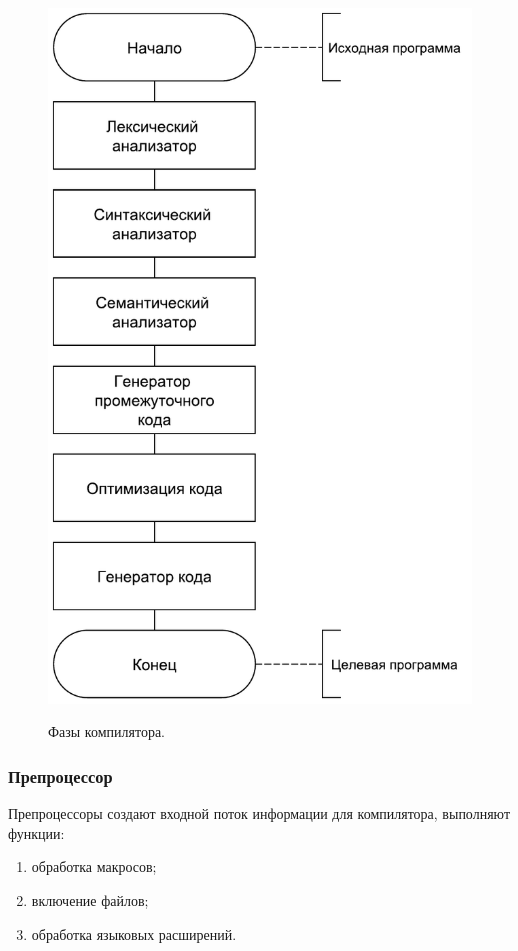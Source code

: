 \begin{figure}[h!]
	\begin{center}
		{\includegraphics[scale = 0.55, page=1]{img/phases.pdf}}
		\caption{Фазы компилятора.}
		\label{fig:phases}
	\end{center}
\end{figure}

\pagebreak

\subsubsection{Препроцессор}
Препроцессоры создают входной поток информации для компилятора, выполняют функции:
\begin{enumerate}
	\item обработка макросов;
	
	\item включение файлов;
	
	\item обработка языковых расширений. \\
\end{enumerate}

